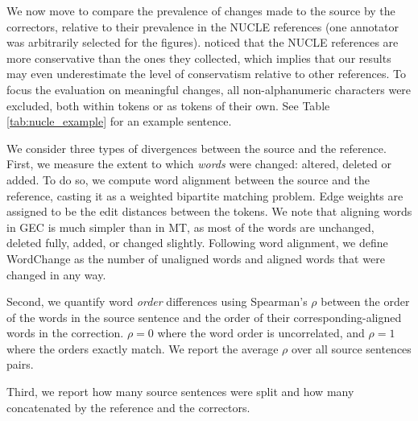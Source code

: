 \documentclass[a4paper, 11pt]{article}
\begin{document}
We now move to compare the prevalence of changes made to the source by the correctors,
relative to their prevalence in the NUCLE references (one annotator was arbitrarily 
selected for the figures). 
 noticed that the NUCLE references are more conservative than 
the ones they collected, which implies that our results may even underestimate the level of conservatism relative to other references.
To focus the evaluation on meaningful changes, all non-alphanumeric characters were 
excluded, both within tokens or as tokens of their own. See Table \ref{tab:nucle_example} for an example sentence.

We consider three types of divergences between the source and the reference.
First, we measure the extent to which \emph{words} were changed: altered, deleted or added.
To do so, we compute word alignment between the source and the reference, casting it
as a weighted bipartite matching problem. Edge weights are assigned to be the edit distances between the tokens.
We note that aligning words in GEC is much simpler than in MT,
as most of the words are unchanged, deleted fully, added, or changed slightly.
Following word alignment, we define {\sc WordChange}
as the number of unaligned words and aligned words that were changed in any way.

Second, we quantify word \emph{order} differences using
Spearman's $\rho$ between the order of the words in the source sentence
and the order of their corresponding-aligned words in the correction.
$\rho=0$ where the word order is uncorrelated, and $\rho=1$ where the orders exactly match. We report the average $\rho$ over all source sentences pairs. 

Third, we report how many source sentences were split and how many concatenated by the reference and the correctors.
\end{document}
